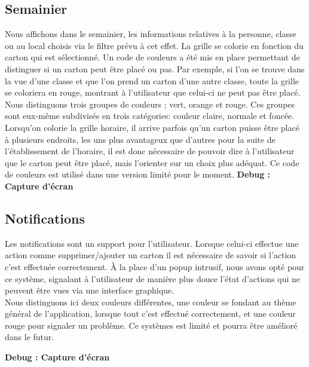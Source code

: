 \subsection{Semainier}
Nous affichons dans le semainier, les informations relatives à la personne, classe ou au local choisis via le filtre prévu à cet effet. La grille se colorie en fonction du carton qui est sélectionné. Un code de couleurs a été mis en place permettant de distinguer si un carton peut être placé ou pas. Par exemple, si l'on se trouve dans la vue d'une classe et que l'on prend un carton d'une autre classe, toute la grille se coloriera en rouge, montrant à l'utilisateur que celui-ci ne peut pas être placé.\\
\newline
\indent
Nous distinguons trois groupes de couleurs ; vert, orange et rouge. Ces groupes sont eux-même subdivisés en trois catégories: couleur claire, normale et foncée. Lorsqu'on colorie la grille horaire, il arrive parfois qu'un carton puisse être placé à plusieurs endroits, les uns plus avantageux que d'autres pour la suite de l'établissement de l'horaire, il est donc nécessaire de pouvoir dire à l'utilisateur que le carton peut être placé, mais l'orienter sur un choix plus adéquat. Ce code de couleurs est utilisé dans une version limité pour le moment.
\bigskip
\textbf{Debug : Capture d'écran}


\subsection{Notifications}
Les notifications sont un support pour l'utilisateur. Lorsque celui-ci effectue une action comme supprimer/ajouter un carton il est nécessaire de savoir si l'action c'est effectuée correctement. À la place d'un popup intrusif, nous avons opté pour ce système, signalant à l'utilisateur de manière plus douce l'état d'actions qui ne peuvent être vues via une interface graphique.\\
\newline
\indent
Nous distinguons ici deux couleurs différentes, une couleur se fondant au thème général de l'application, lorsque tout c'est effectué correctement, et une couleur rouge pour signaler un problème. Ce systèmes est limité et pourra être amélioré dans le futur.\\
\newline
\indent

\textbf{Debug : Capture d'écran}


